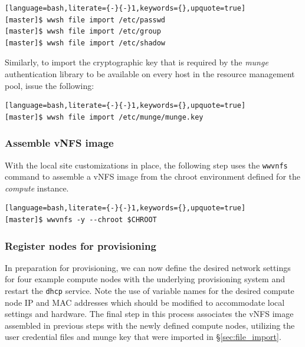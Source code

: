 \documentclass[letterpaper]{article}
\begin{document}
\begin{lstlisting}[language=bash,literate={-}{-}1,keywords={},upquote=true]
[master]$ wwsh file import /etc/passwd                                                                                                       
[master]$ wwsh file import /etc/group
[master]$ wwsh file import /etc/shadow 
\end{lstlisting}

Similarly, to import the cryptographic key that is required by the {\em munge}
authentication library to be available on every host in the resource management
pool, issue the following:

\begin{lstlisting}[language=bash,literate={-}{-}1,keywords={},upquote=true]
[master]$ wwsh file import /etc/munge/munge.key
\end{lstlisting}


\subsubsection{Assemble vNFS image}

With the local site customizations in place, the following step uses the
\texttt{wwvnfs} command to assemble a vNFS image from the chroot environment
defined for the {\em compute} instance. 

\begin{lstlisting}[language=bash,literate={-}{-}1,keywords={},upquote=true]
[master]$ wwvnfs -y --chroot $CHROOT
\end{lstlisting}

\subsubsection{Register nodes for provisioning}

In preparation for provisioning, we can now define the desired network settings
for four example compute nodes with the underlying provisioning system and
restart the \texttt{dhcp} service. Note the use of variable names for the
desired compute node IP and MAC addresses which should be modified to
accommodate local settings and hardware. The final step in this process
associates the vNFS image assembled in previous steps with the newly defined
compute nodes, utilizing the user credential files and munge key that were
imported in \S\ref{sec:file_import}.
\end{document}
